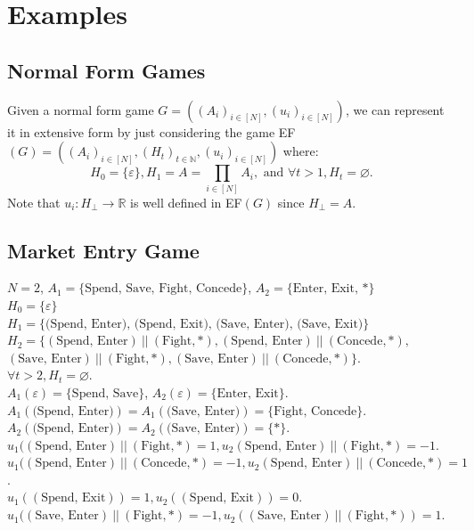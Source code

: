 \documentclass[11pt]{article}
\theoremstyle{definition}
\theoremstyle{plain}
\begin{document}
\section{Examples}
\subsection*{Normal Form Games}
Given a normal form game $G=((A_i)_{i \in [N]},(u_i)_{i \in [N]})$, we can represent it in extensive form by just considering the game EF$(G)=((A_i)_{i \in [N]},(H_{t})_{t \in \mathbb{N}},(u_i)_{i \in [N]})$ where: 
$$H_0=\{\varepsilon\}, H_1=A=\prod_{i \in [N]} A_i, \text{ and } \forall t >1, H_t=\varnothing.$$
Note that $u_i: H_{\bot}\to \mathbb{R}$ is well defined in EF$(G)$ since $H_{\bot}=A$. 

\subsection*{Market Entry Game}
$N=2$, $A_1=\{\text{Spend, Save, Fight, Concede}\}$, $A_2=\{\text{Enter, Exit, }*\}$
\\
$H_0=\{\varepsilon\}$
\\
$H_1=\{\text{(Spend, Enter), (Spend, Exit), (Save, Enter), (Save, Exit)}\}$
\\
$H_2=\{(\text{Spend, Enter}) \ || \ (\text{Fight},*), (\text{Spend, Enter}) \ || \ (\text{Concede},*),$ 
\\
$(\text{Save, Enter}) \ || \ (\text{Fight},*), (\text{Save, Enter}) \ || \ (\text{Concede},*)\}.$
\\
$\forall t>2, H_t=\varnothing$.
\\
$A_1(\varepsilon)=\{\text{Spend, Save}\}$, $A_2(\varepsilon)=\{\text{Enter, Exit}\}$.
\\
$A_1(\text{(Spend, Enter)})=A_1(\text{(Save, Enter)})=\{\text{Fight, Concede}\}$.
\\
$A_2(\text{(Spend, Enter)})=A_2(\text{(Save, Enter)})=\{*\}$.
\\
$u_1((\text{Spend, Enter}) \ || \ (\text{Fight},*)=1, u_2(\text{Spend, Enter}) \ || \ (\text{Fight},*)=-1$.
\\
$u_1((\text{Spend, Enter}) \ || \ (\text{Concede},*)=-1, u_2(\text{Spend, Enter}) \ || \ (\text{Concede},*)=1$.
\\
$u_1((\text{Spend, Exit}))=1, u_2((\text{Spend, Exit}))=0$.
\\
$u_1((\text{Save, Enter}) \ || \ (\text{Fight},*)=-1, u_2((\text{Save, Enter}) \ || \ (\text{Fight},*))=1$.
\\
\end{document}
